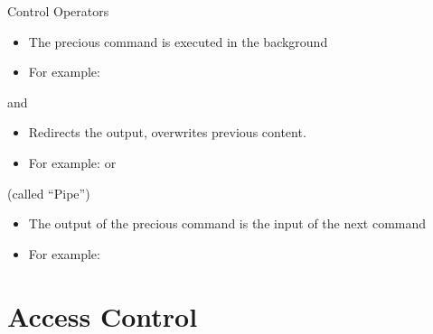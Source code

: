 \documentclass{setbeamer}
\begin{document}
\begin{frame}{Control Operators}
    \begin{itemize}
        \item The precious command is executed in the background
        \item For example: 
    \end{itemize}

    \vspace{0.3cm}

     and 
    \begin{itemize}
        \item Redirects the output,  overwrites previous content.
        \item For example:  or 
    \end{itemize}

    \vspace{0.3cm}

     (called ``Pipe'')
    \begin{itemize}
        \item The output of the precious command is the input of the next command
        \item For example: 
    \end{itemize}
\end{frame} 





\section{Access Control}
\end{document}
